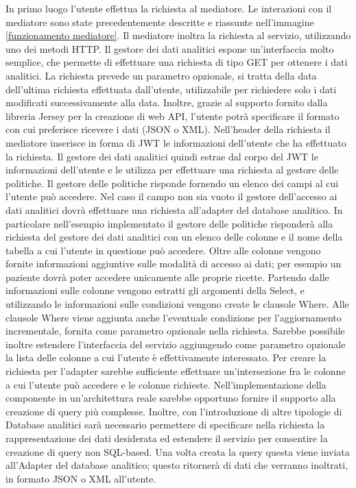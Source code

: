 \documentclass[12pt]{report}
\begin{document}
In primo luogo l'utente effettua la richiesta al mediatore. 
Le interazioni con il mediatore sono state precedentemente descritte e riassunte nell'immagine \ref{funzionamento mediatore}.
Il mediatore inoltra la richiesta al servizio, utilizzando uno dei metodi HTTP.
Il gestore dei dati analitici espone un'interfaccia molto semplice, che permette di effettuare una richiesta di tipo GET per ottenere i dati analitici.
La richiesta prevede un parametro opzionale, si tratta della data dell'ultima richiesta effettuata dall'utente, utilizzabile per richiedere solo i dati modificati successivamente alla data.
Inoltre, grazie al supporto fornito dalla libreria Jersey per la creazione di web API, l'utente potrà specificare il formato con cui preferisce ricevere i dati (JSON o XML).
Nell'header della richiesta il mediatore inserisce in forma di JWT le informazioni dell'utente che ha effettuato la richiesta.
Il gestore dei dati analitici quindi estrae dal corpo del JWT le informazioni dell'utente e le utilizza per effettuare una richiesta al gestore delle politiche.
Il gestore delle politiche risponde fornendo un elenco dei campi al cui l'utente può accedere.
Nel caso il campo non sia vuoto il gestore dell'accesso ai dati analitici dovrà effettuare una richiesta all'adapter del database analitico.
In particolare nell'esempio implementato il gestore delle politiche risponderà alla richiesta del gestore dei dati analitici con un elenco delle colonne e il nome della tabella a cui l'utente in questione può accedere.
Oltre alle colonne vengono fornite informazioni aggiuntive sulle modalità di accesso ai dati; per esempio un paziente dovrà poter accedere unicamente alle proprie ricette.
Partendo dalle informazioni sulle colonne vengono estratti gli argomenti della Select, e utilizzando le informazioni sulle condizioni vengono create le clausole Where.
Alle clausole Where viene aggiunta anche l'eventuale condizione per l'aggiornamento incrementale, fornita come parametro opzionale nella richiesta.
Sarebbe possibile inoltre estendere l'interfaccia del servizio aggiungendo come parametro opzionale la lista delle colonne a cui l'utente è effettivamente interessato.
Per creare la richiesta per l'adapter sarebbe sufficiente effettuare un'intersezione fra le colonne a cui l'utente può accedere e le colonne richieste.
Nell'implementazione della componente in un'architettura reale sarebbe opportuno fornire il supporto alla creazione di query più complesse.
Inoltre, con l'introduzione di altre tipologie di Database analitici sarà necessario permettere di specificare nella richiesta la rappresentazione dei dati desiderata ed estendere il servizio per consentire la creazione di query non SQL-based. 
Una volta creata la query questa viene inviata all'Adapter del database analitico; questo ritornerà di dati che verranno inoltrati, in formato JSON o XML all'utente.
\end{document}
